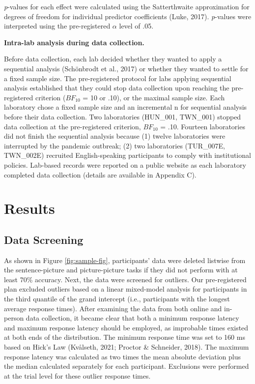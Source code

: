 \documentclass[
  man,floatsintext]{apa7}
\begin{document}
\emph{p}-values for each effect were calculated using the Satterthwaite
approximation for degrees of freedom for individual predictor
coefficients (Luke, 2017). \emph{p}-values were
interpreted using the pre-registered \(\alpha\) level of .05.

\textbf{Intra-lab analysis during data collection.}

Before data collection, each lab decided whether they wanted to apply a
sequential analysis (Schönbrodt et al., 2017) or
whether they wanted to settle for a fixed sample size. The
pre-registered protocol for labs applying sequential analysis
established that they could stop data collection upon reaching the
pre-registered criterion (\(BF_{10}\) = 10 or .10), or the maximal sample
size. Each laboratory chose a fixed sample size and an incremental n for
sequential analysis before their data collection. Two laboratories
(HUN\_001, TWN\_001) stopped data collection at the pre-registered
criterion, \(BF_{10}\) = .10. Fourteen laboratories did not finish the
sequential analysis because (1) twelve laboratories were interrupted by
the pandemic outbreak; (2) two laboratories (TUR\_007E, TWN\_002E)
recruited English-speaking participants to comply with institutional
policies. Lab-based records were reported on a public website as each
laboratory completed data collection (details are available in Appendix
C).

\hypertarget{results}{%
\section{Results}\label{results}}

\hypertarget{data-screening}{%
\subsection{Data Screening}\label{data-screening}}

As shown in Figure \ref{fig:sample-fig}, participants' data were
deleted listwise from the sentence-picture and picture-picture tasks if
they did not perform with at least 70\% accuracy. Next, the data were
screened for outliers. Our pre-registered plan excluded outliers based
on a linear mixed-model analysis for participants in the third quantile
of the grand intercept (i.e., participants with the longest average
response times). After examining the data from both online and in-person
data collection, it became clear that both a minimum response latency
and maximum response latency should be employed, as improbable times
existed at both ends of the distribution. The minimum response time was
set to 160 ms based on Hick's Law (Kvålseth, 2021; Proctor \& Schneider, 2018). The maximum response latency was calculated
as two times the mean absolute deviation plus the median calculated
separately for each participant. Exclusions were performed at the trial
level for these outlier response times.
\end{document}
